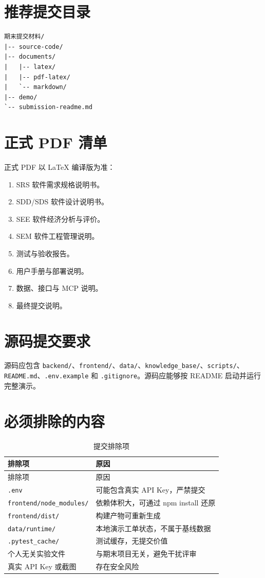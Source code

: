 \documentclass[12pt,a4paper]{ctexart}
\newcommand{\code}[1]{{\footnotesize\nolinkurl{#1}}}
\begin{document}
\section{推荐提交目录}
\begin{verbatim}
期末提交材料/
|-- source-code/
|-- documents/
|   |-- latex/
|   |-- pdf-latex/
|   `-- markdown/
|-- demo/
`-- submission-readme.md
\end{verbatim}

\section{正式 PDF 清单}
正式 PDF 以 LaTeX 编译版为准：
\begin{enumerate}
    \item SRS 软件需求规格说明书。
    \item SDD/SDS 软件设计说明书。
    \item SEE 软件经济分析与评价。
    \item SEM 软件工程管理说明。
    \item 测试与验收报告。
    \item 用户手册与部署说明。
    \item 数据、接口与 MCP 说明。
    \item 最终提交说明。
\end{enumerate}

\section{源码提交要求}
源码应包含 \code{backend/}、\code{frontend/}、\code{data/}、\code{knowledge_base/}、\code{scripts/}、\code{README.md}、\code{.env.example} 和 \code{.gitignore}。源码应能够按 README 启动并运行完整演示。

\section{必须排除的内容}
\begin{longtable}{p{4cm}p{9.8cm}}
\caption{提交排除项}\\
\toprule
排除项 & 原因 \\
\midrule
\endfirsthead
\toprule
排除项 & 原因 \\
\midrule
\endhead
\code{.env} & 可能包含真实 API Key，严禁提交 \\
\code{frontend/node_modules/} & 依赖体积大，可通过 npm install 还原 \\
\code{frontend/dist/} & 构建产物可重新生成 \\
\code{data/runtime/} & 本地演示工单状态，不属于基线数据 \\
\code{.pytest_cache/} & 测试缓存，无提交价值 \\
个人无关实验文件 & 与期末项目无关，避免干扰评审 \\
真实 API Key 或截图 & 存在安全风险 \\
\bottomrule
\end{longtable}
\end{document}
